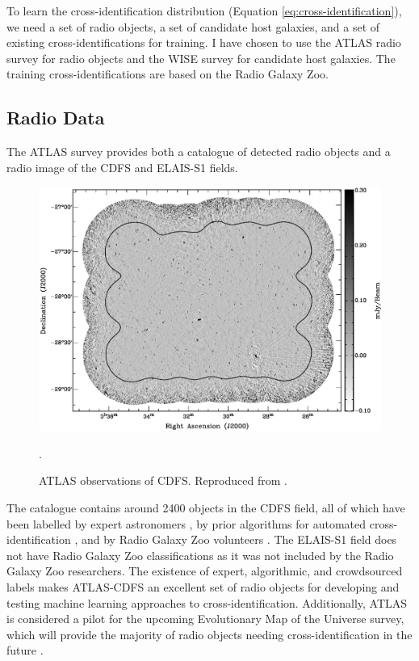   To learn the cross-identification distribution (Equation \ref{eq:cross-identification}), we need a set of radio objects, a set of candidate host galaxies, and a set of existing cross-identifications for training. I have chosen to use the ATLAS radio survey for radio objects and the WISE survey for candidate host galaxies. The training cross-identifications are based on the Radio Galaxy Zoo.

  \subsection{Radio Data}
  \label{ssec:radio-data}

    The ATLAS survey \citep{franzen15}  provides both a catalogue of detected radio objects and a radio image of the CDFS and ELAIS-S1 fields.

    \begin{figure}[!ht]
      \centering
      \includegraphics[width=0.8\linewidth,]{images/ATLAS-CDFS-cropped.pdf}
      \caption{ATLAS observations of CDFS. Reproduced from \citet{franzen15}.}.
      \label{fig:cdfs}
    \end{figure}

    The catalogue contains around 2400 objects in the CDFS field, all of which have been labelled by expert astronomers \citep{norris06}, by prior algorithms for automated cross-identification \citep{fan15}, and by Radio Galaxy Zoo volunteers \citep{banfield15}. The ELAIS-S1 field does not have Radio Galaxy Zoo classifications as it was not included by the Radio Galaxy Zoo researchers. The existence of expert, algorithmic, and crowdsourced labels makes ATLAS-CDFS an excellent set of radio objects for developing and testing machine learning approaches to cross-identification. Additionally, ATLAS is considered a pilot for the upcoming Evolutionary Map of the Universe survey, which will provide the majority of radio objects needing cross-identification in the future \citep{banfield15}.

